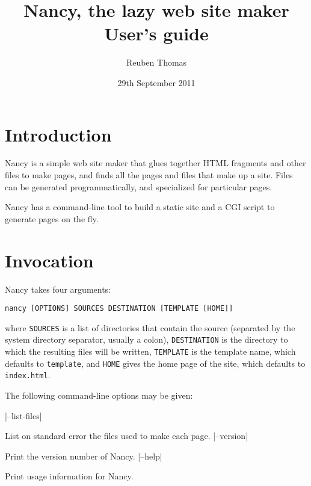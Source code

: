 \documentclass[english]{scrartcl}
\begin{document}
\title{Nancy, the lazy web site maker\\User’s guide}
\date{29th September 2011}
\author{Reuben Thomas}
\maketitle

\section{Introduction}

Nancy is a simple web site maker that glues together HTML fragments and other files to make pages, and finds all the pages and files that make up a site. Files can be generated programmatically, and specialized for particular pages.

Nancy has a command-line tool to build a static site and a CGI script to generate pages on the fly.

\section{Invocation}

Nancy takes four arguments:

\begin{verbatim}
nancy [OPTIONS] SOURCES DESTINATION [TEMPLATE [HOME]]
\end{verbatim}

\noindent where \verb|SOURCES| is a list of directories that contain the source (separated by the system directory separator, usually a colon), \verb|DESTINATION| is the directory to which the resulting files will be written, \verb|TEMPLATE| is the template name, which defaults to \verb|template|, and \verb|HOME| gives the home page of the site, which defaults to \verb|index.html|.

The following command-line options may be given:

\begin{description}
|--list-files|
\item[\UseVerb{listfiles}]List on standard error the files used to make each page.
|--version|
\item[\UseVerb{version}]Print the version number of Nancy.
|--help|
\item[\UseVerb{help}]Print usage information for Nancy.
\end{description}
\end{document}

